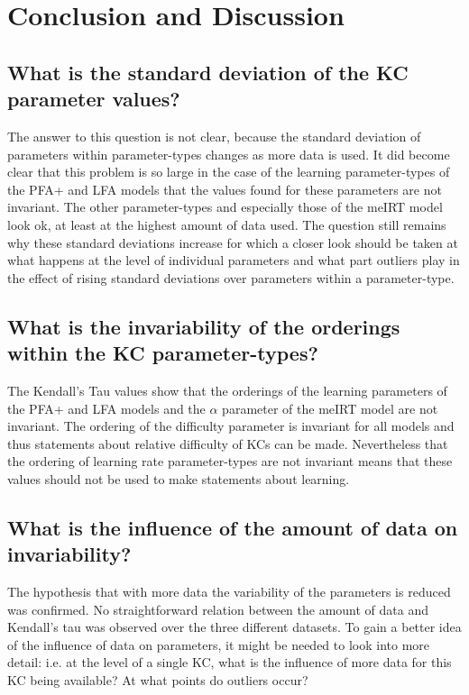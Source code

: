 \documentclass{scrartcl}
\newcommand\todo[1]{\textit{\textcolor{red}{#1}}}
\begin{document}

\section{Conclusion and Discussion}
\subsection{What is the standard deviation of the KC parameter values?}
The answer to this question is not clear, because the standard deviation of parameters within parameter-types changes as more data is used. It did become clear that this problem is so large in the case of the learning parameter-types of the PFA+ and LFA models that the values found for these parameters are not invariant. The other parameter-types and especially those of the meIRT model look ok, at least at the highest amount of data used. The question still remains why these standard deviations increase for which a closer look should be taken at what happens at the level of individual parameters and what part outliers play in the effect of rising standard deviations over parameters within a parameter-type.

\subsection{What is the invariability of the orderings within the KC parameter-types?}
The Kendall's Tau values show that the orderings of the learning parameters of the PFA+ and LFA models and the $\alpha$ parameter of the meIRT model are not invariant. The ordering of the difficulty parameter is invariant for all models and thus statements about relative difficulty of KCs can be made. Nevertheless that the ordering of learning rate parameter-types are not invariant means that these values should not be used to make statements about learning.  

\subsection{What is the influence of the amount of data on invariability?}
The hypothesis that with more data the variability of the parameters is reduced was confirmed. No straightforward relation between the amount of data and Kendall's tau was observed over the three different datasets. To gain a better idea of the influence of data on parameters, it might be needed to look into more detail: i.e. at the level of a single KC, what is the influence of more data for this KC being available? At what points do outliers occur? 
\end{document}
